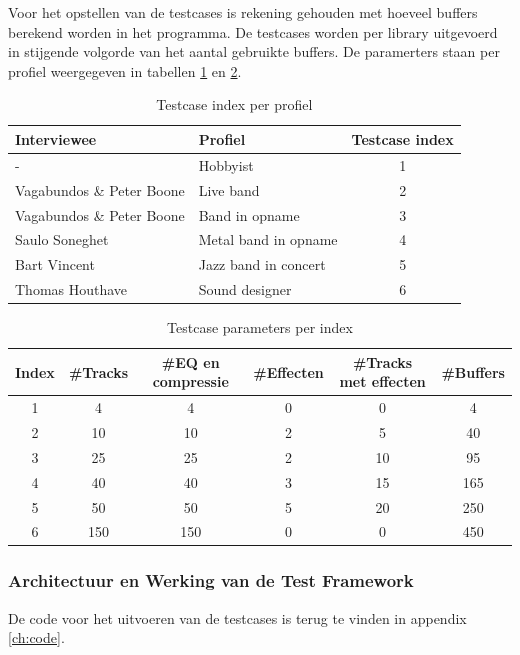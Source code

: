 Voor het opstellen van de testcases is rekening gehouden met hoeveel buffers berekend worden in het programma. De testcases worden per library uitgevoerd in stijgende volgorde van het aantal gebruikte buffers. De paramerters staan per profiel weergegeven in tabellen \ref{tab:profielen} en \ref{tab:parameters}.

\begin{table}[]
\begin{tabular}{ll|c}
\textbf{Interviewee} & \textbf{Profiel} & \textbf{Testcase index} \\ \hline
- & Hobbyist & 1 \\
Vagabundos \& Peter Boone & Live band & 2 \\
Vagabundos \& Peter Boone & Band in opname & 3 \\
Saulo Soneghet & Metal band in opname & 4 \\
Bart Vincent & Jazz band in concert & 5 \\
Thomas Houthave & Sound designer & 6 \\ \hline
\end{tabular}
\caption{Testcase index per profiel}
\label{tab:profielen}
\end{table}

\begin{table}[]
\begin{tabular}{c|cccc|c}
\textbf{Index} & \textbf{\#Tracks} & \textbf{\#EQ en compressie} & \textbf{\#Effecten} & \textbf{\#Tracks met effecten} & \textbf{\#Buffers} \\ \hline
1 & 4 & 4 & 0 & 0 & 4 \\
2 & 10 & 10 & 2 & 5 & 40 \\
3 & 25 & 25 & 2 & 10 & 95 \\
4 & 40 & 40 & 3 & 15 & 165 \\
5 & 50 & 50 & 5 & 20 & 250 \\
6 & 150 & 150 & 0 & 0 & 450 
\end{tabular}
\caption{Testcase parameters per index}
\label{tab:parameters}
\end{table}

\subsubsection{Architectuur en Werking van de Test Framework}
\label{subsub:testframework}

De code voor het uitvoeren van de testcases is terug te vinden in appendix \ref{ch:code}.

